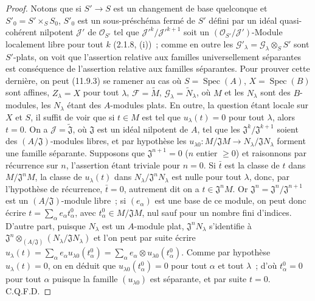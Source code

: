 \begin{proof}
Notons que si $S'\to S$ est un changement de base quelconque et
$S'_0=S'\times_S S_0$, $S'_0$ est un sous-préschéma fermé de $S'$ défini par
un idéal quasi-cohérent nilpotent $\mathcal J'$ de $\mathcal O_{S'}$ tel que
$\mathcal J'^k/\mathcal J'^{k+1}$ soit un
$(\mathcal O_{S'}/\mathcal J')$-Module localement libre pour tout $k$
(2.1.8, (i))~; comme en outre les
$\mathcal G'_\lambda=\mathcal G_\lambda\otimes_S S'$ sont $S'$-plats, on voit
que l'assertion relative aux familles universellement séparantes est
conséquence de l'assertion relative aux familles séparantes. Pour prouver
cette dernière, on peut (11.9.3) se ramener au cas où
$S=\operatorname{Spec}(A)$, $X=\operatorname{Spec}(B)$ sont affines,
$Z_\lambda=X$ pour tout $\lambda$, $\mathcal F=\widetilde M$,
$\mathcal G_\lambda=\widetilde N_\lambda$, où $M$ et les $N_\lambda$ sont des
$B$-modules, les $N_\lambda$ étant des $A$-modules plats. En outre, la question
étant locale sur $X$ et $S$, il suffit de voir que si $t\in M$ est tel que
$u_\lambda(t)=0$ pour tout $\lambda$, alors $t=0$. On a
$\mathcal J=\widetilde{\mathfrak J}$, où $\mathfrak J$ est un idéal nilpotent
de $A$, tel que les $\mathfrak J^k/\mathfrak J^{k+1}$ soient des
$(A/\mathfrak J)$-modules libres, et par hypothèse les
$u_{\lambda0}:M/\mathfrak JM\to N_\lambda/\mathfrak JN_\lambda$ forment une
famille séparante. Supposons que $\mathfrak J^{n+1}=0$ ($n$ entier $\geq0$) et
raisonnons par récurrence sur $n$, l'assertion étant triviale pour $n=0$. Si
$\bar t$ est la classe de $t$ dans $M/\mathfrak J^nM$, la classe de
$u_\lambda(t)$ dans $N_\lambda/\mathfrak J^nN_\lambda$ est nulle pour tout
$\lambda$, donc, par l'hypothèse de récurrence, $\bar t=0$, autrement dit on a
$t\in\mathfrak J^nM$. Or
$\mathfrak J^n=\mathfrak J^n/\mathfrak J^{n+1}$ est un
$(A/\mathfrak J)$-module libre~; si $(e_\alpha)$ est une base de ce module, on
peut donc écrire $t=\sum_\alpha e_\alpha t^0_\alpha$, avec
$t^0_\alpha\in M/\mathfrak JM$, nul sauf pour un nombre fini d'indices.
D'autre part, puisque $N_\lambda$ est un $A$-module plat,
$\mathfrak J^nN_\lambda$ s'identifie à
$\mathfrak J^n\otimes_{(A/\mathfrak J)}(N_\lambda/\mathfrak JN_\lambda)$ et
l'on peut par suite écrire
$u_\lambda(t)=\sum_\alpha e_\alpha u_{\lambda0}(t^0_\alpha)
=\sum_\alpha e_\alpha\otimes u_{\lambda0}(t^0_\alpha)$.
Comme par hypothèse $u_\lambda(t)=0$, on en déduit que
$u_{\lambda0}(t^0_\alpha)=0$ pour tout $\alpha$ et tout $\lambda$~; d'où
$t^0_\alpha=0$ pour tout $\alpha$ puisque la famille $(u_{\lambda0})$ est
séparante, et par suite $t=0$. C.Q.F.D.
\end{proof}

